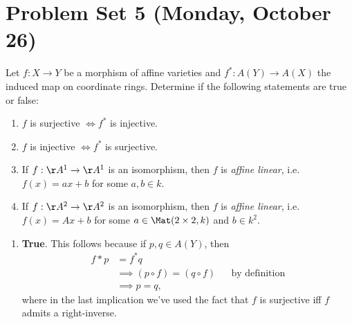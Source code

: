 \hypertarget{problem-set-5-monday-october-26}{%
\section{Problem Set 5 (Monday, October
26)}\label{problem-set-5-monday-october-26}}

\begin{problem}[Gathmann 4.13]

Let \(f:X\to Y\) be a morphism of affine varieties and
\(f^*: A(Y) \to A(X)\) the induced map on coordinate rings. Determine if
the following statements are true or false:

\begin{enumerate}
\def\labelenumi{\alph{enumi}.}
\item
  \(f\) is surjective \(\iff f^*\) is injective.
\item
  \(f\) is injective \(\iff f^*\) is surjective.
\item
  If \(f:\AA^1\to\AA^1\) is an isomorphism, then \(f\) is \emph{affine
  linear}, i.e.~\(f(x) = ax+b\) for some \(a, b\in k\).
\item
  If \(f:\AA^2\to\AA^2\) is an isomorphism, then \(f\) is \emph{affine
  linear}, i.e.~\(f(x) = Ax+b\) for some \(a \in \Mat(2\times 2, k)\)
  and \(b\in k^2\).
\end{enumerate}

\end{problem}

\begin{solution}

\hfill

\begin{enumerate}
\def\labelenumi{\alph{enumi}.}
\tightlist
\item
  \textbf{True}. This follows because if \(p, q\in A(Y)\), then
  \begin{align*}  
    f* p &= f^* q \\
    &\implies (p\circ f) = (q\circ f) && \text{by definition}\\
    &\implies p = q 
    ,\end{align*} where in the last implication we've used the fact that
  \(f\) is surjective iff \(f\) admits a right-inverse.
\end{enumerate}

\end{solution}

